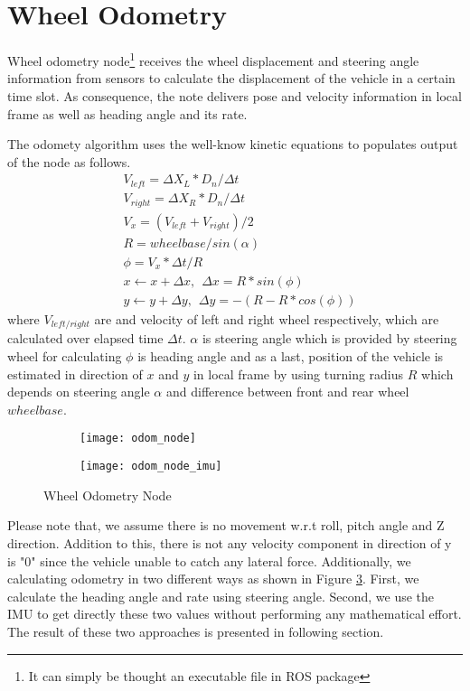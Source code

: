\section{Wheel Odometry}
Wheel odometry node\footnote{It can simply be thought an executable file in ROS package} receives the wheel displacement and steering angle information from sensors to calculate the displacement of the vehicle in a certain time slot. As consequence, the note delivers pose and velocity information in local frame as well as heading angle and its rate.
\\
\par The odomety algorithm uses the well-know kinetic equations to populates output of the node as follows.
\begin{align}
    &V_{left} = \Delta X_L*D_n/ \Delta t\\
    &V_{right} = \Delta X_R*D_n/ \Delta t\\
    &V_x = (V_{left}+V_{right})/2\\
    &R = wheelbase/sin(\alpha)\\
    &\phi = V_x * \Delta t / R\\
    &x \leftarrow x+\Delta x, \hspace{5pt} \Delta x = R * sin(\phi)\\
    &y \leftarrow y+\Delta y, \hspace{5pt} \Delta y = -(R-R*cos(\phi))
\end{align}
where $V_{left/right}$ are and velocity of left and right wheel respectively, which are calculated over elapsed time $\Delta t$. $\alpha$ is steering angle which is provided by steering wheel for calculating $\phi$ is heading angle and as a last,  position of the vehicle is estimated in direction of $x$ and $y$ in local frame by using turning radius $R$ which depends on steering angle $\alpha$ and difference between front and rear wheel $wheelbase$.\\
\begin{figure}[H]
    \begin{subfigure}{.5\textwidth}
        \texttt{[image: odom\_node]}
        \label{fig:odom_pose}
    \end{subfigure}
    \begin{subfigure}{.5\textwidth}
        \texttt{[image: odom\_node\_imu]}
        \label{fig:odom_pose_imu}
    \end{subfigure}
    \caption{Wheel Odometry Node}
    \label{fig:odometry}
\end{figure}
\noindent Please note that, we assume there is no movement w.r.t roll, pitch angle and Z direction. Addition to this, there is not any velocity component in direction of y is "0" since the vehicle unable to catch any lateral force. Additionally, we calculating odometry in two different ways as shown in Figure \ref{fig:odometry}. First, we calculate the heading angle and rate using steering angle. Second, we use the IMU to get directly these two values without performing any mathematical effort. The result of these two approaches is presented in following section.

